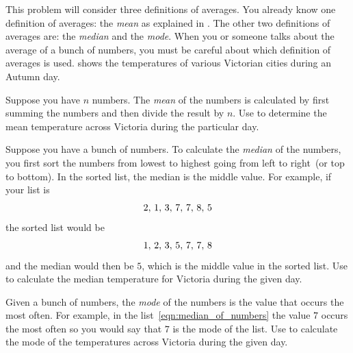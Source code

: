 \documentclass[a4paper,oneside,12pt]{article}
\begin{document}
\begin{problem}
\begin{table}[!htbp]
\centering

\caption{%
  The temperatures of various cities within Victoria, Australia during
  an Autumn day.  Temperature is measured in Celsius.
}
\label{tab:Victoria_temperature}
\end{table}

\item This problem will consider three definitions of averages.  You
  already know one definition of averages: the \emph{mean} as
  explained in .  The other two definitions of
  averages are: the \emph{median} and the \emph{mode}.  When you or
  someone talks about the average of a bunch of numbers, you must be
  careful about which definition of averages is used.
   shows the temperatures of various
  Victorian cities during an Autumn day.
  \begin{packedenum}
  \item\label{subprob:mean_temperature}
    Suppose you have $n$ numbers.  The \emph{mean} of the numbers is
    calculated by first summing the numbers and then divide the result
    by $n$.  Use  to determine the
    mean temperature across Victoria during the particular day.

  \item\label{subprob:median_temperature}
    Suppose you have a bunch of numbers.  To calculate the
    \emph{median} of the numbers, you first sort the numbers from
    lowest to highest going from left to right~(or top to bottom).  In
    the sorted list, the median is the middle value.  For example, if
    your list is
    \begin{equation}
    \label{eqn:median_of_numbers}
    {2},\, {1},\, {3},\, {7},\, {7},\, {8},\, {5}
    \end{equation}
    the sorted list would be
    \[
    {1},\, {2},\, {3},\, {5},\, {7},\, {7},\, {8}
    \]
    and the median would then be $5$, which is the middle value in the
    sorted list.  Use  to calculate
    the median temperature for Victoria during the given day.

  \item\label{subprob:mode_temperature}
    Given a bunch of numbers, the \emph{mode} of the numbers is the
    value that occurs the most often.  For example, in the
    list~\eqref{eqn:median_of_numbers} the value $7$ occurs the most
    often so you would say that $7$ is the mode of the list.  Use
     to calculate the mode of the
    temperatures across Victoria during the given day.
  \end{packedenum}
\end{problem}
\end{document}

